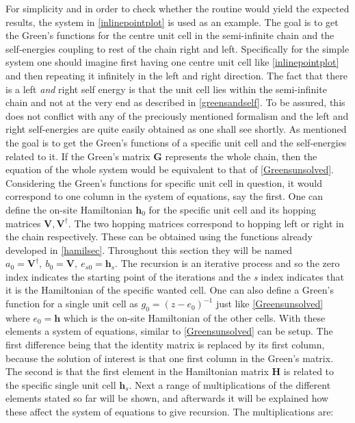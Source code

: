 For simplicity and in order to check whether the routine would yield the expected results, the system in \cref{inlinepointplot} is used as an example. The goal is to get the Green's functions for the centre unit cell in the semi-infinite chain and the self-energies coupling to rest of the chain right and left. Specifically for the simple system one should imagine first having one centre unit cell like \cref{inlinepointplot} and then repeating it infinitely in the left and right direction. The fact that there is a left \textit{and} right self energy is that the unit cell lies within the semi-infinite chain and not at the very end as described in \cref{greensandself}. To be assured, this does not conflict with any of the preciously mentioned formalism and the left and right self-energies are quite easily obtained as one shall see shortly. As mentioned the goal is to get the Green's functions of a specific unit cell and the self-energies related to it. If the Green's matrix \(\mathbf{G}\) represents the whole chain, then the equation of the whole system would be equivalent to that of \cref{Greensunsolved}. Considering the Green's functions for specific unit cell in question, it would correspond to one column in the system of equations, say the first. One can define the on-site Hamiltonian \(\mathbf{h}_0\) for the specific unit cell and its hopping matrices \(\mathbf{V},\mathbf{V}^{\dagger}\).  The two hopping matrices correspond to hopping left or right in the chain respectively. These can be obtained using the functions already developed in \cref{hamilsec}. Throughout this section they will be named \(a_0 = \mathbf{V}^{\dagger}, \ b_0 = \mathbf{V}, \ e_{s0} = \mathbf{h}_{s}\). The recursion is an iterative process and so the zero index indicates the starting point of the iterations and the \textit{s} index indicates that it is the Hamiltonian of the specific wanted cell. One can also define a Green's function for a single unit cell as \(g_0 = (z-e_{0})^{-1}\) just like \cref{Greensunsolved} where \(e_{0}=\mathbf{h}\) which is the on-site Hamiltonian of the other cells. With these elements a system of equations, similar to \cref{Greensunsolved} can be setup. The first difference being that the identity matrix is replaced by its first column, because the solution of interest is that one first column in the Green's matrix. The second is that the first element in the Hamiltonian matrix \(\mathbf{H}\) is related to the specific single unit cell \(\mathbf{h}_s\). Next a range of multiplications of the different elements stated so far will be shown, and afterwards it will be explained how these affect the system of equations to give recursion. The multiplications are:
